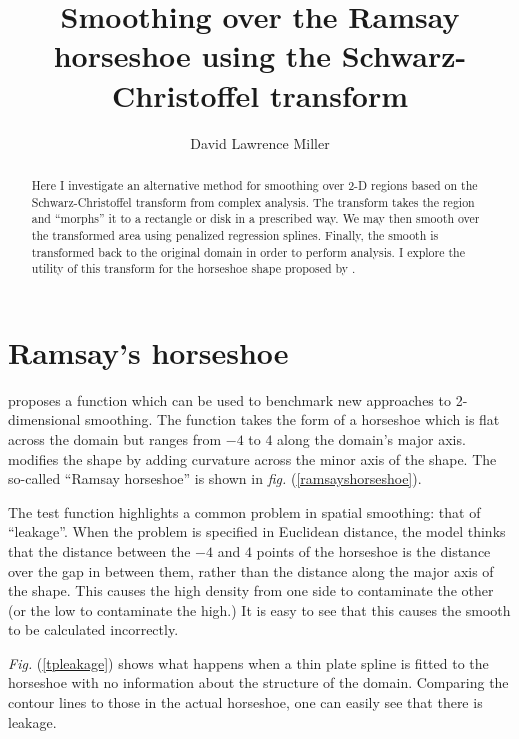 \documentclass[a4paper,10pt]{amsart}
\title{Smoothing over the Ramsay horseshoe using the Schwarz-Christoffel transform}
\author{David Lawrence Miller}
\newcommand{\fig}[1]{\emph{fig.} (\ref{#1})}
\newcommand{\Fig}[1]{\emph{Fig.} (\ref{#1})}
\begin{document}
\begin{abstract}
Here I investigate an alternative method for smoothing over 2-D regions based on the Schwarz-Christoffel transform from complex analysis. The transform takes the region and ``morphs'' it to a rectangle or disk in a prescribed way. We may then smooth over the transformed area using penalized regression splines. Finally, the smooth is transformed back to the original domain in order to perform analysis. I explore the utility of this transform for the horseshoe shape proposed by \cite{ramsay}.
\end{abstract}


\newtheorem{thm}{Theorem}[section]

\newtheorem{defn}{Definition}[section]

\maketitle



\section{Ramsay's horseshoe}

\cite{ramsay} proposes a function which can be used to benchmark new approaches to 2-dimensional smoothing. The function takes the form of a horseshoe which is flat across the domain but ranges from $-4$ to $4$ along the domain's major axis. \cite{soap} modifies the shape by adding curvature across the minor axis of the shape. The so-called ``Ramsay horseshoe'' is shown in \fig{ramsayshorseshoe}.

The test function highlights a common problem in spatial smoothing: that of ``leakage''. When the problem is specified in Euclidean distance, the model thinks that the distance between the $-4$ and $4$ points of the horseshoe is the distance over the gap in between them, rather than the distance along the major axis of the shape. This causes the high density from one side to contaminate the other (or the low to contaminate the high.) It is easy to see that this causes the smooth to be calculated incorrectly.

\Fig{tpleakage} shows what happens when a thin plate spline is fitted to the horseshoe with no information about the structure of the domain. Comparing the contour lines to those in the actual horseshoe, one can easily see that there is leakage.
\end{document}
